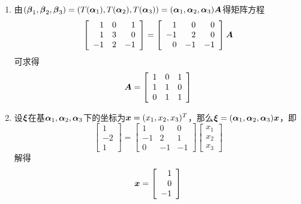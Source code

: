 \begin{frame}  
  \begin{jie}
    \begin{enumerate}
    \item 由$(\boldsymbol{\beta}_1,\boldsymbol{\beta}_2,\boldsymbol{\beta}_3)=(T(\boldsymbol{\alpha}_1),T(\boldsymbol{\alpha}_2),T(\boldsymbol{\alpha}_3))=(\boldsymbol{\alpha}_1,\boldsymbol{\alpha}_2,\boldsymbol{\alpha}_3)\boldsymbol{A}$得矩阵方程
      $$
      \left[
        \begin{array}{rrr}
          1&0&1\\
          1&3&0\\
          -1&2&-1
        \end{array}
      \right]=\left[
        \begin{array}{rrr}
          1&0&0\\
          -1&2&0\\
           0&-1&-1
        \end{array}
      \right]\boldsymbol{A}
      $$
      可求得
      $$
      \boldsymbol{A}=\left[
        \begin{array}{rrr}
          1&0&1\\
          1&1&0\\
          0&1&1
        \end{array}
      \right]
      $$
    \item 设$\boldsymbol{\xi}$在基$\boldsymbol{\alpha}_1,\boldsymbol{\alpha}_2,\boldsymbol{\alpha}_3$下的坐标为${\boldsymbol{x}}=(x_1,x_2,x_3)^T$，那么$\boldsymbol{\xi}=(\boldsymbol{\alpha}_1,\boldsymbol{\alpha}_2,\boldsymbol{\alpha}_3){\boldsymbol{x}}$，即
      $$
      \left[
        \begin{array}{rrr}
          1\\
          -2\\
          1
        \end{array}
      \right]=\left[
        \begin{array}{rrr}
          1&0&0\\
          -1&2&1\\
          0&-1&-1
        \end{array}
      \right]\left[
        \begin{array}{rrr}
          x_1\\
          x_2\\
          x_3
        \end{array}
      \right]
      $$
      解得
      $$
      {\boldsymbol{x}}=\left[
        \begin{array}{rrr}
          1\\
          0\\
          -1
        \end{array}
      \right]
      $$
      
    \end{enumerate}
  \end{jie}
\end{frame}

